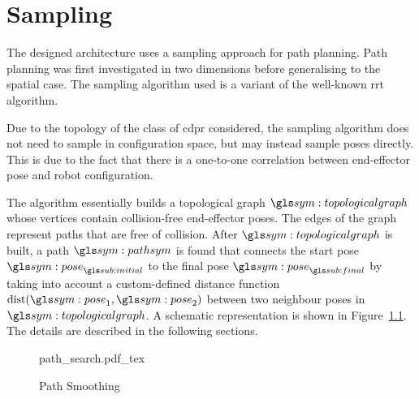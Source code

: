 \chapter{Sampling}%
\label{chap:sampling}

	The designed architecture uses a sampling approach for path
	planning. Path planning was first investigated in two dimensions before
	generalising to the spatial case. The sampling algorithm
	used is a variant of the well-known \gls{rrt} algorithm.

	Due to the topology of the class of \gls{cdpr} considered, the sampling
	algorithm does not need to sample in configuration space, but may instead
	sample poses directly. This is due to the fact that there is a one-to-one
	correlation between end-effector pose and robot configuration.

	The algorithm essentially builds a topological graph $\topologicalgraph$
	whose vertices contain collision-free end-effector poses. The edges of the
	graph represent paths that are free of collision. After $\topologicalgraph$
	is built, a path $\pathsym$ is found that connects the start pose
	$\pose_{\initial}$ to the final pose $\pose_{\final}$ by taking into account
	a custom-defined distance function $\dist(\pose_1, \pose_2)$ between two
	neighbour poses in $\topologicalgraph$. A schematic representation is shown
	in Figure~\ref{fig:path_search}. The details are described in the following
	sections.

	\begin{figure}[hb]
		\centering
		\def\svgwidth{\columnwidth}
		{path_search.pdf_tex}
		\caption{Path Smoothing}%
		\label{fig:path_search}
	\end{figure}

	
	
	
	

